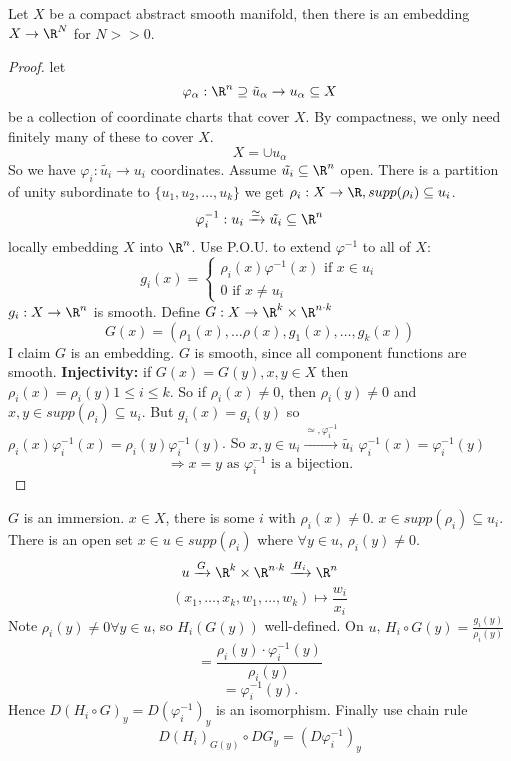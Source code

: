 \begin{theorem}
  Let $X$ be a compact abstract smooth manifold, then there is an embedding $X\to \R^N$ for $N>>0$.
\end{theorem}
\begin{proof}
   let $$\varphi_{\alpha}: \R^n \supseteq\tilde{u}_\alpha \to u_\alpha \subseteq X$$
   be a collection of coordinate charts that cover $X$. By compactness, we only need finitely many of these to cover $X$.
    $$X= \cup u_\alpha$$
  So we have $\varphi_i:\tilde{u_i}\to u_i$ coordinates. Assume $\tilde{u_i}\subseteq \R^n$ open. There is a partition of unity subordinate to $\{ u_1, u_2, \dots, u_k\}$ we get $\rho_i: X\to \R, supp(\rho_i)\subseteq u_i$.
    $$\varphi_i^{-1}: u_i \xrightarrow{\simeq}\tilde{u_i}\subseteq \R^n$$
    locally embedding $X$ into $\R^n$. Use P.O.U. to extend $\varphi^{-1}$ to all of $X$:
  $$g_i(x)=
  \begin{cases}
      \rho_i(x)\varphi^{-1}(x) \text{ if } x\in u_i \\
      0 \text{ if } x\neq u_i
  \end{cases}$$
  $g_i: X\to \R^n$ is smooth.
  \newline Define $G:X\to \R^k \times \R^{n \cdot k}$
    $$G(x)=(\rho_1(x), \dots \rho(x), g_1(x), \dots, g_k(x))$$
    I claim $G$ is an embedding.
     \newline $G$ is smooth, since all component functions are smooth.
     \newline \textbf{Injectivity:} if $G(x)= G(y), x,y \in X$ then $\rho_i(x)=\rho_i(y) 1\leq i \leq k$. So if $\rho_i(x)\neq 0$, then $\rho_i(y)\neq 0$ and $x,y\in supp(\rho_i)\subseteq u_i$. But $g_i(x)=g_i(y)$ so $\rho_i(x)\varphi_i^{-1}(x)= \rho_i(y)\varphi_i^{-1}(y)$.
     So $x,y \in u_i \xrightarrow{\simeq , \varphi_i^{-1}}\tilde{u_i}$ $\varphi_i^{-1}(x)=\varphi_i^{-1}(y)$
     $$\Rightarrow x=y \text{ as } \varphi_i^{-1} \text{ is a bijection.}$$
\end{proof}
$G$ is an immersion. $x\in X$, there is some $i$ with $\rho_i(x)\neq 0$. $x\in supp(\rho_i)\subseteq u_i$. There is an open set $x\in u\in supp(\rho_i)$ where $\forall y \in u$, $\rho_i(y)\neq 0$.
  $$u \xrightarrow{G}\R^k \times \R^{n \cdot k} \xrightarrow{H_i}\R^n$$
  $$(x_1, \dots, x_k, w_1, \dots, w_k) \mapsto \frac{w_i}{x_i}$$
  Note $\rho_i(y)\neq 0 \forall y \in u$, so $H_i(G(y))$ well-defined.
  On $u$, $H_i \circ G(y)= \frac{g_i(y)}{\rho_i(y)}$
$$=\frac{\rho_i(y) \cdot \varphi_i^{-1}(y)}{\rho_i(y)}$$
$$=\varphi_i^{-1}(y).$$
Hence $D(H_i \circ G)_y = D(\varphi_i^{-1})_y$ is an isomorphism. Finally use chain rule
  $$D(H_i)_{G(y)} \circ DG_y = (D\varphi_i^{-1})_y$$
